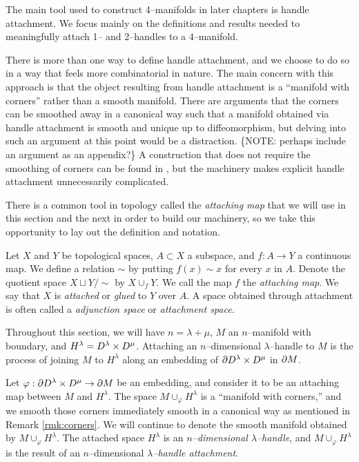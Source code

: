 The main tool used to construct 4--manifolds in later chapters is handle attachment.
We focus mainly on the definitions and results needed to meaningfully attach 1-- and 2--handles to a 4--manifold.

\begin{rmk}
	\label{rmk:corners}
	There is more than one way to define handle attachment, and we choose to do so in a way that feels more combinatorial in nature.
	The main concern with this approach is that the object resulting from handle attachment is a ``manifold with corners'' rather than a smooth manifold.
	There are arguments that the corners can be smoothed away in a canonical way such that a manifold obtained via handle attachment is smooth and unique up to diffeomorphism, but delving into such an argument at this point would be a distraction.
	\{NOTE: perhaps include an argument as an appendix?\}
	A construction that does not require the smoothing of corners can be found in \cite{Kosi93}, but the machinery makes explicit handle attachment unnecessarily complicated.
\end{rmk}

There is a common tool in topology called the \emph{attaching map} that we will use in this section and the next in order to build our machinery, so we take this opportunity to lay out the definition and notation.

\begin{defn}
  Let $X$ and $Y$ be topological spaces, $A\subset X$ a subspace, and $f:A\to Y$ a continuous map.
  We define a relation $\sim$ by putting $f(x)\sim x$ for every $x$ in $A$.
  Denote the quotient space $X\sqcup Y/\sim$ by $X\cup_f Y$.
  We call the map $f$ the \emph{attaching map}.  
  We say that $X$ is \emph{attached} or \emph{glued} to $Y$ over $A$.
  A space obtained through attachment is often called a \emph{adjunction space} or \emph{attachment space}.
\end{defn}

Throughout this section, we will have $n=\lambda+\mu$, $M$ an $n$--manifold with boundary, and $H^\lambda=D^\lambda\times D^\mu$.
Attaching an $n$--dimensional $\lambda$--handle to $M$ is the process of joining $M$ to $H^\lambda$ along an embedding of $\partial D^\lambda\times D^\mu$ in $\partial M$. 

\begin{defn}[Handle]
	\label{def:handle}
	Let $\varphi:\partial D^\lambda\times D^\mu\to\partial M$ be an embedding, and consider it to be an attaching map between $M$ and $H^\lambda$.
	The space $M\cup_\varphi H^\lambda$ is a ``manifold with corners,'' and we smooth those corners immediately smooth in a canonical way as mentioned in Remark \ref{rmk:corners}.
	We will continue to denote the smooth manifold obtained by $M\cup_\varphi H^\lambda$.
	The attached space $H^\lambda$ is an \emph{$n$--dimensional $\lambda$--handle}, and $M\cup_\varphi H^\lambda$ is the result of an $n$--dimensional \emph{$\lambda$--handle attachment}.
\end{defn}

